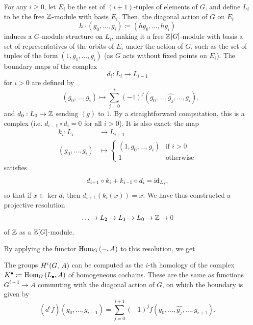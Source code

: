 \documentclass[a4paper, oneside]{memoir}
\begin{document}
For any $i\geq 0$, let $E_i$ be the set of $(i+1)$-tuples of elements of $G$, and define $L_i$ to be the free $\mathbb{Z}$-module with basis $E_i$. Then, the diagonal action of $G$ on $E_i$
\[
    h\cdot (g_0,\dots , g_i) \coloneqq (h g_0 ,\dots , h g_{i} )
\]
induces a $G$-module structure on $L_i$, making it a free $\mathbb{Z}[G]$-module with basis a set of representatives of the orbits of $E_i$ under the action of $G$, such as the set of tuples of the form $(1,g_1,\dots , g_i)$ (as $G$ acts without fixed points on $E_i$). The boundary maps of the complex
\[
    d_i: L_i \to L_{i-1}
\]
for $i>0$ are defined by
\[
    \quad (g_0,\dots , g_i) \mapsto \sum_{j=0}^{i} (-1)^j (g_0,\dots , \hat{g_j},\dots , g_i),
\]
and $d_0:L_0\to\mathbb{Z}$ sending $(g)$ to $1$. By a straightforward computation, this is a complex (i.e. $d_{i-1}\circ d_i=0$ for all $i>0$). It is also exact: the map
\begin{align*}
    k_i: L_i          & \to L_{i+1} \\
    (g_0,\dots , g_i) & \mapsto
    \begin{cases}
        (1,g_0,\dots , g_i) & \text{if } i>0   \\
        1                   & \text{otherwise}
    \end{cases}
\end{align*}
satisfies
\[
    d_{i+1}\circ k_i + k_{i-1}\circ d_i = \operatorname{id}_{L_i},
\]
so that if $x\in\ker{d_i}$ then $d_{i+1}(k_i(x))=x$.
We have thus constructed a projective resolution
\[
    \ldots\to L_2\to L_1\to L_0\to\mathbb{Z}\to 0
\]
of $\mathbb{Z}$ as a $\mathbb{Z}[G]$-module.

By applying the functor $\operatorname{Hom}_G{(-,A)}$ to this resolution, we get
\begin{theorem}
    The groups $H^{i}( G, \, A )$ can be computed as the $i$-th homology of the complex $K^\bullet\coloneqq \operatorname{Hom}_G{(L_\bullet,A)}$ of \textnormal{homogeneous} cochains. These are the same as functions $G^{i+1}\to A$ commuting with the diagonal action of $G$, on which the boundary is given by
    \[
        (d^i f)(g_0,\dots , g_{i+1})=\sum_{j=0}^{i+1} (-1)^j f(g_0,\dots , \hat{g_j},\dots , g_{i+1}).
    \]
\end{theorem}
\end{document}
